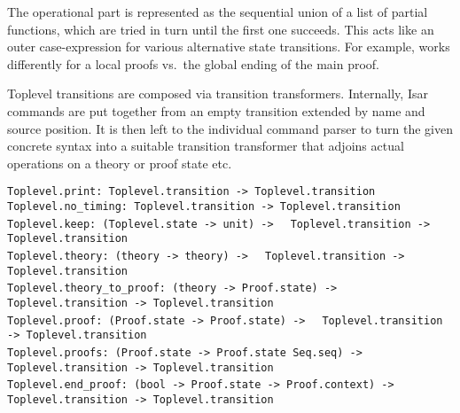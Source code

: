 \begin{isabellebody}
\begin{isamarkuptext}
  The operational part is represented as the sequential union of a
  list of partial functions, which are tried in turn until the first
  one succeeds.  This acts like an outer case-expression for various
  alternative state transitions.  For example,  works
  differently for a local proofs vs.\ the global ending of the main
  proof.

  Toplevel transitions are composed via transition transformers.
  Internally, Isar commands are put together from an empty transition
  extended by name and source position.  It is then left to the
  individual command parser to turn the given concrete syntax into a
  suitable transition transformer that adjoins actual operations on a
  theory or proof state etc.%
\end{isamarkuptext}%
\isamarkuptrue%
%
\isadelimmlref
%
\endisadelimmlref
%
\isatagmlref
%
\begin{isamarkuptext}%
\begin{mldecls}
  \verb|Toplevel.print: Toplevel.transition -> Toplevel.transition| \\
  \verb|Toplevel.no_timing: Toplevel.transition -> Toplevel.transition| \\
  \verb|Toplevel.keep: (Toplevel.state -> unit) ->|\isasep\isanewline%
\verb|  Toplevel.transition -> Toplevel.transition| \\
  \verb|Toplevel.theory: (theory -> theory) ->|\isasep\isanewline%
\verb|  Toplevel.transition -> Toplevel.transition| \\
  \verb|Toplevel.theory_to_proof: (theory -> Proof.state) ->|\isasep\isanewline%
\verb|  Toplevel.transition -> Toplevel.transition| \\
  \verb|Toplevel.proof: (Proof.state -> Proof.state) ->|\isasep\isanewline%
\verb|  Toplevel.transition -> Toplevel.transition| \\
  \verb|Toplevel.proofs: (Proof.state -> Proof.state Seq.seq) ->|\isasep\isanewline%
\verb|  Toplevel.transition -> Toplevel.transition| \\
  \verb|Toplevel.end_proof: (bool -> Proof.state -> Proof.context) ->|\isasep\isanewline%
\verb|  Toplevel.transition -> Toplevel.transition| \\
  \end{mldecls}


\end{isamarkuptext}
\end{isabellebody}
